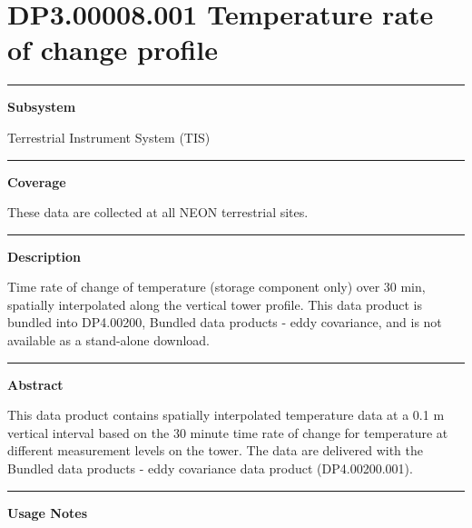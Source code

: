 \documentclass[]{article}
\begin{document}
\section{DP3.00008.001 Temperature rate of change
profile}\label{dp3.00008.001-temperature-rate-of-change-profile}

\begin{center}\rule{0.5\linewidth}{\linethickness}\end{center}

\textbf{Subsystem}

Terrestrial Instrument System (TIS)

\begin{center}\rule{0.5\linewidth}{\linethickness}\end{center}

\textbf{Coverage}

These data are collected at all NEON terrestrial sites.

\begin{center}\rule{0.5\linewidth}{\linethickness}\end{center}

\textbf{Description}

Time rate of change of temperature (storage component only) over 30 min,
spatially interpolated along the vertical tower profile. This data
product is bundled into DP4.00200, Bundled data products - eddy
covariance, and is not available as a stand-alone download.

\begin{center}\rule{0.5\linewidth}{\linethickness}\end{center}

\textbf{Abstract}

This data product contains spatially interpolated temperature data at a
0.1 m vertical interval based on the 30 minute time rate of change for
temperature at different measurement levels on the tower. The data are
delivered with the Bundled data products - eddy covariance data product
(DP4.00200.001).

\begin{center}\rule{0.5\linewidth}{\linethickness}\end{center}

\textbf{Usage Notes}
\end{document}
